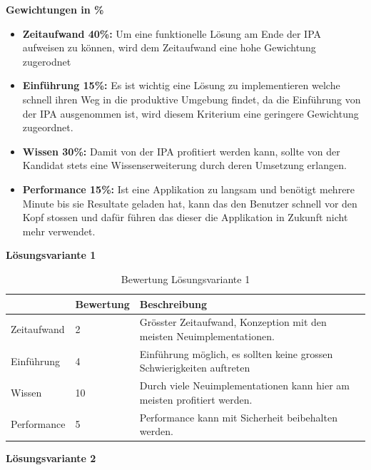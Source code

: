 \textbf{Gewichtungen in \%}

\begin{itemize}
   \item \textbf{Zeitaufwand 40\%:} Um eine funktionelle Lösung am Ende der IPA aufweisen zu können, wird dem Zeitaufwand eine hohe Gewichtung zugerodnet
   \item \textbf{Einführung 15\%:} Es ist wichtig eine Lösung zu implementieren welche schnell ihren Weg in die produktive Umgebung findet, da die Einführung von der IPA ausgenommen ist, wird diesem Kriterium eine geringere Gewichtung zugeordnet.
   \item \textbf{Wissen 30\%:} Damit von der IPA profitiert werden kann, sollte von der Kandidat stets eine Wissenserweiterung durch deren Umsetzung erlangen. 
   \item \textbf{Performance 15\%: } Ist eine Applikation zu langsam und benötigt mehrere Minute bis sie Resultate geladen hat, kann das den Benutzer schnell vor den Kopf stossen und dafür führen das dieser die Applikation in Zukunft nicht mehr verwendet.
\end{itemize}

\textbf{Lösungsvariante 1}

\begin{table}[h!]
   \begin{tabular}{|L{0.2\textwidth}|L{0.2\textwidth}|L{0.6\textwidth}|}
      \hline
       & \color{white}\textbf{Bewertung} & \color{white}\textbf{Beschreibung}\\[2pt]
      \hline
      Zeitaufwand & 2 & Grösster Zeitaufwand, Konzeption mit den meisten Neuimplementationen. \\
      \hline
      Einführung & 4 & Einführung möglich, es sollten keine grossen Schwierigkeiten auftreten \\
      \hline 
      Wissen & 10 & Durch viele Neuimplementationen kann hier am meisten profitiert werden. \\
      \hline
      Performance & 5 & Performance kann mit Sicherheit beibehalten werden. \\
      \hline
   \end{tabular}
   \caption{Bewertung Lösungsvariante 1}
\end{table}

\newpage

\textbf{Lösungsvariante 2}

